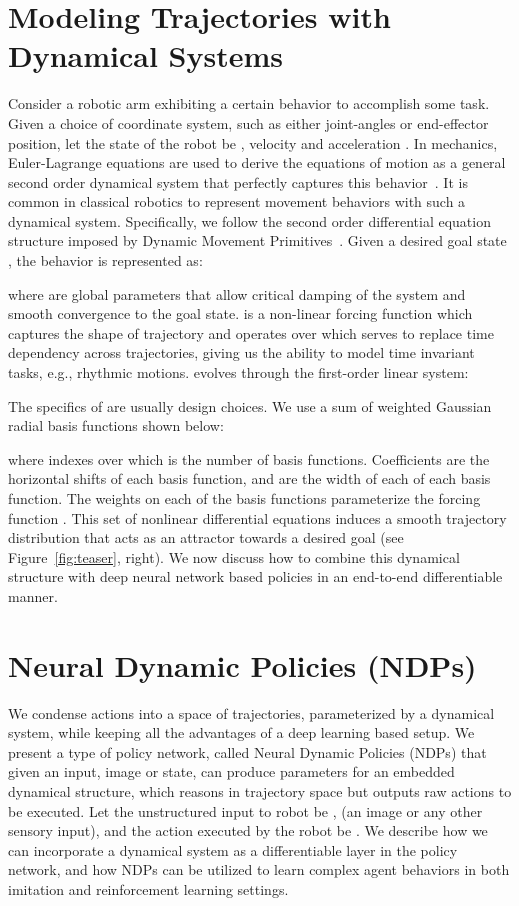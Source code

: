 \documentclass{article}
\newcommand{\ours}{NDPs\xspace}
\begin{document}
\section{Modeling Trajectories with Dynamical Systems}
\label{sec:dmp}
Consider a robotic arm exhibiting a certain behavior to accomplish some task. Given a choice of coordinate system, such as either joint-angles or end-effector position, let the state of the robot be , velocity  and acceleration . In mechanics, Euler-Lagrange equations are used to derive the equations of motion as a general second order dynamical system that perfectly captures this behavior~\cite[Chapter~6]{spong2020robot}. It is common in classical robotics to represent movement behaviors with such a dynamical system. Specifically, we follow the second order differential equation structure imposed by Dynamic Movement Primitives~\cite{isprt2012dmp,schaal2006dynamic,pastor2009motorskills}. Given a desired goal state , the behavior is represented as:

where  are global parameters that allow critical damping of the system and smooth convergence to the goal state.  is a non-linear forcing function which captures the shape of trajectory and operates over  which serves to replace time dependency across trajectories, giving us the ability to model time invariant tasks, e.g., rhythmic motions.  evolves through the first-order linear system:

 The specifics of  are usually design choices. We use a sum of weighted Gaussian radial basis functions \cite{isprt2012dmp} shown below:
 
where  indexes over  which is the number of basis functions. Coefficients  are the horizontal shifts of each basis function, and  are the width of each of each basis function. The weights on each of the basis functions  parameterize the forcing function . This set of nonlinear differential equations induces a smooth trajectory distribution that acts as an attractor towards a desired goal (see Figure~\ref{fig:teaser}, right). We now discuss how to combine this dynamical structure with deep neural network based policies in an end-to-end differentiable manner.

\section{Neural Dynamic Policies (\ours)}
We condense actions into a space of trajectories, parameterized by a dynamical system, while keeping all the advantages of a deep learning based setup. We present a type of policy network, called Neural Dynamic Policies (\ours) that given an input, image or state, can produce parameters for an embedded dynamical structure, which reasons in trajectory space but outputs raw actions to be executed. Let the unstructured input to robot be , (an image or any other sensory input), and the action executed by the robot be . We describe how we can incorporate a dynamical system as a differentiable layer in the policy network, and how \ours can be utilized to learn complex agent behaviors in both imitation and reinforcement learning settings.
\end{document}
